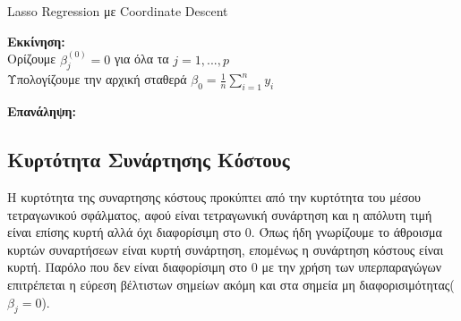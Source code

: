 \documentclass[12pt]{article}
\begin{document}
\begin{algorithm}[H]
\caption{\textlatin{Lasso Regression με Coordinate Descent}}
\SetAlgoLined
{} 

\BlankLine
\textbf{Εκκίνηση:}\\
Ορίζουμε \( \beta_j^{(0)} = 0 \) για όλα τα \( j = 1,...,p \) \\
Υπολογίζουμε την αρχική σταθερά \( \beta_0 = \frac{1}{n} \sum_{i=1}^{n} y_i \) \\
\BlankLine

\textbf{Επανάληψη:} \\
\BlankLine

\end{algorithm}

\subsection{Κυρτότητα Συνάρτησης Κόστους}
Η κυρτότητα της συναρτησης κόστους προκύπτει από την κυρτότητα του μέσου τετραγωνικού σφάλματος, αφού είναι τετραγωνική συνάρτηση και η απόλυτη τιμή είναι επίσης κυρτή αλλά όχι διαφορίσιμη στο 0. Όπως ήδη γνωρίζουμε το άθροισμα κυρτών συναρτήσεων είναι κυρτή συνάρτηση, επομένως η συνάρτηση κόστους είναι κυρτή. Παρόλο που δεν είναι διαφορίσιμη στο 0 με την χρήση των υπερπαραγώγων επιτρέπεται η εύρεση βέλτιστων σημείων ακόμη και στα σημεία μη διαφορισιμότητας($\beta_j = 0$).
\end{document}
